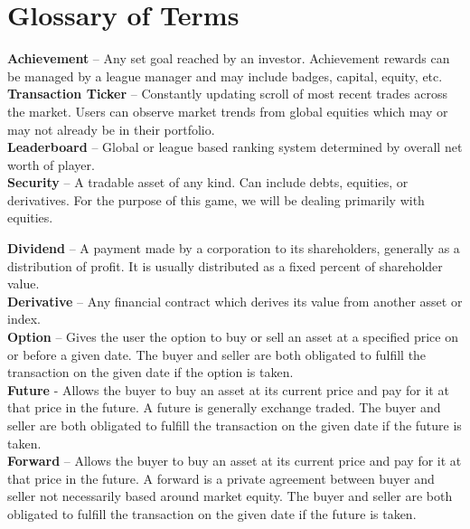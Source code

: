 \section{Glossary of Terms}



\textbf{Achievement} -- Any set goal reached by an investor.
Achievement rewards can be managed by a league manager and
may include badges, capital, equity, etc.\\

\textbf{Transaction Ticker} -- Constantly updating scroll of
most recent trades across the market. Users can observe market
trends from global equities which may or may not already be
in their portfolio.\\

\textbf{Leaderboard} -- Global or league based ranking system
determined by overall net worth of player.\\

\textbf{Security} -- A tradable asset of any kind. Can include
debts, equities, or derivatives. For the purpose of this game,
we will be dealing primarily with equities.\newline

\textbf{Dividend} -- A payment made by a corporation to its
shareholders, generally as a distribution of profit. It is
usually distributed as a fixed percent of shareholder value.\\

\textbf{Derivative} -- Any financial contract which derives its
value from another asset or index.\\

\textbf{Option} -- Gives the user the option to buy or sell an
asset at a specified price on or before a given date. The buyer
and seller are both obligated to fulfill the transaction on the
given date if the option is taken.\\

\textbf{Future} - Allows the buyer to buy an asset at its current
price and pay for it at that price in the future. A future is
generally exchange traded. The buyer and seller are both obligated
to fulfill the transaction on the given date if the future is taken.\\

\textbf{Forward} -- Allows the buyer to buy an asset at its current
price and pay for it at that price in the future. A forward is a
private agreement between buyer and seller not necessarily based around
market equity. The buyer and seller are both obligated to fulfill
the transaction on the given date if the future is taken.\\


